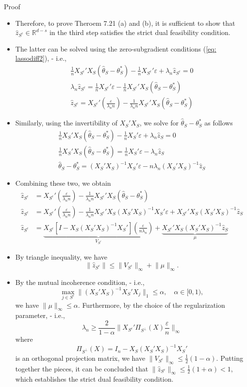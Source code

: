 \documentclass[10pt,handout,english]{beamer}
\newcommand{\R}{\mathbb{R}}
\begin{document}
\begin{frame}[allowframebreaks]{Proof}
\begin{itemize}
\item Therefore, to prove Theroem 7.21 (a) and (b), it is sufficient to show that $\hat{z}_{S^c}\in\R^{d-s}$ in the third step satisfies the strict dual feasibility condition.\justifying
\item The latter can be solved using the zero-subgradient conditions (\ref{eq: lassodiff2}), - i.e.,\justifying
\begin{align*}
\frac{1}{n}X_{S^c}'X_S(\hat{\theta}_S-\theta_S^*)-\frac{1}{n}X_{S^c}'\varepsilon+\lambda_n\hat{z}_{S^c}=0\\
\lambda_n\hat{z}_{S^c}=\frac{1}{n}X_{S^c}'\varepsilon-\frac{1}{n}X_{S^c}'X_S(\hat{\theta}_S-\theta_S^*)\\
\hat{z}_{S^c}=X_{S^c}'\left(\frac{\varepsilon}{\lambda_nn}\right)-\frac{1}{\lambda_nn}X_{S^c}'X_S(\hat{\theta}_S-\theta_S^*)
\end{align*}
\item Similarly, using the invertibility of $X_S'X_S$, we solve for $\hat{\theta}_S-\theta_{S}^*$ as follows\justifying
\begin{align*}
\frac{1}{n}X_S'X_S(\hat{\theta}_S-\theta_S^*)-\frac{1}{n}X_S'\varepsilon+\lambda_n\hat{z}_S=0\\
\frac{1}{n}X_S'X_S(\hat{\theta}_S-\theta_S^*)=\frac{1}{n}X_S'\varepsilon-\lambda_n\hat{z}_S\\
\hat{\theta}_S-\theta_S^*=(X_S'X_S)^{-1}X_S'\varepsilon-n\lambda_n(X_S'X_S)^{-1}\hat{z}_S
\end{align*}
\item Combining these two, we obtain\justifying
\begin{align*}
\hat{z}_{S^c}&=X_{S^c}'\left(\frac{\varepsilon}{\lambda_nn}\right)-\frac{1}{\lambda_nn}X_{S^c}'X_S(\hat{\theta}_S-\theta_S^*)\\
\hat{z}_{S^c}&=X_{S^c}'\left(\frac{\varepsilon}{\lambda_nn}\right)-\frac{1}{\lambda_nn}X_{S^c}'X_S(X_S'X_S)^{-1}X_S'\varepsilon+X_{S^c}'X_S(X_S'X_S)^{-1}\hat{z}_S\\
\hat{z}_{S^c}&=\underbrace{X_{S^c}\left[I-X_S(X_S'X_S)^{-1}X_S'\right]\left(\frac{\varepsilon}{n\lambda_n}\right)}_{V_{S^c}}+\underbrace{X_{S^c}'X_S(X_S'X_S)^{-1}\hat{z}_S}_{\mu}
\end{align*} 
\item By triangle inequality, we have\justifying
\[
\lVert \hat{z}_{S^c}\rVert\leq \lVert V_{S^c}\rVert_{\infty}+\lVert \mu\rVert_{\infty}.
\]
\item By the mutual incoherence condition, - i.e.,\justifying
\[
\max_{j\in S^c}\lVert (X_S'X_S)^{-1}X_S'X_j\rVert_1\leq \alpha,\quad \alpha\in[0,1),
\]
we have $\lVert\mu\rVert_{\infty}\leq \alpha$. Furthermore, by the choice of the regularization parameter, - i.e.,
\[
\lambda_n\geq\frac{2}{1-\alpha}\Bigg\lVert X_{S^c}'\Pi_{S^{\perp}}(X)\frac{\varepsilon}{n}\Bigg\rVert_{\infty}
\]
where 
\[
\Pi_{S^{\perp}}(X)=I_n-X_S(X_S'X_S)^{-1}X_S'
\] 
is an orthogonal projection matrix, we have $\lVert V_{S^c}\rVert_{\infty}\leq \frac{1}{2}(1-\alpha)$. Putting together the pieces, it can be concluded that $\lVert\hat{z}_{S^c}\rVert_{\infty}\leq \frac{1}{2}(1+\alpha)<1$, which establishes the strict dual feasibility condition.


\end{itemize}
\end{frame}
\end{document}
